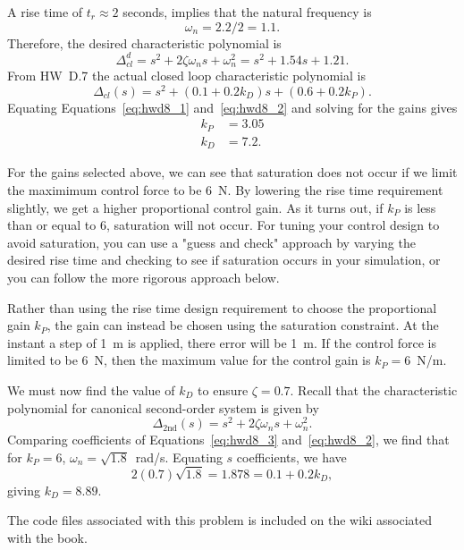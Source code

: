 A rise time of $t_r\approx 2$ seconds, implies that the natural frequency is
\[
\omega_n = 2.2/2 = 1.1.
\]
Therefore, the desired characteristic polynomial is
\begin{equation}\label{eq:hwd8_1}
\Delta_{cl}^d = s^2 + 2\zeta\omega_n s + \omega_n^2 = s^2 + 1.54 s + 1.21.
\end{equation}
From HW~D.7 the actual closed loop characteristic polynomial is
\begin{equation}\label{eq:hwd8_2}
\Delta_{cl}(s) = s^2 + (0.1 + 0.2k_D)s + (0.6 + 0.2k_P).
\end{equation}
Equating Equations~\eqref{eq:hwd8_1} and~\eqref{eq:hwd8_2} and solving for the gains gives
\begin{align*}
k_P &=  3.05 \\
k_D &= 7.2.
\end{align*}

For the gains selected above, we can see that saturation does not occur if we limit the maximimum control force to be 6~N. By lowering the rise time requirement slightly, we get a higher proportional control gain. As it turns out, if $k_P$ is less than or equal to 6, saturation will not occur. For tuning your control design to avoid saturation, you can use a "guess and check" approach by varying the desired rise time and checking to see if saturation occurs in your simulation, or you can follow the more rigorous approach below.

Rather than using the rise time design requirement to choose the proportional gain $k_P$, the gain can instead be chosen using the saturation constraint. At the instant a step of 1~m is applied, there error will be 1~m. If the control force is limited to be 6~N, then the maximum value for the control gain is $k_P = 6$~N/m.

We must now find the value of $k_D$ to ensure $\zeta=0.7$. Recall that the characteristic polynomial for canonical second-order system is given by
\begin{equation} \label{eq:hwd8_3}
	\Delta_{\textrm{2nd}}(s) = s^2 + 2 \zeta \omega_n s + \omega_n^2 .
\end{equation}
%
Comparing coefficients of Equations~\eqref{eq:hwd8_3} and~\eqref{eq:hwd8_2}, we find that for $k_P=6$, $\omega_n=\sqrt{1.8}$~rad/s. Equating $s$ coefficients, we have
\[
	2(0.7)\sqrt{1.8} = 1.878 = 0.1+0.2 k_D , 
\]
giving $k_D = 8.89$.

The code files associated with this problem is included on the wiki associated with the book.
    